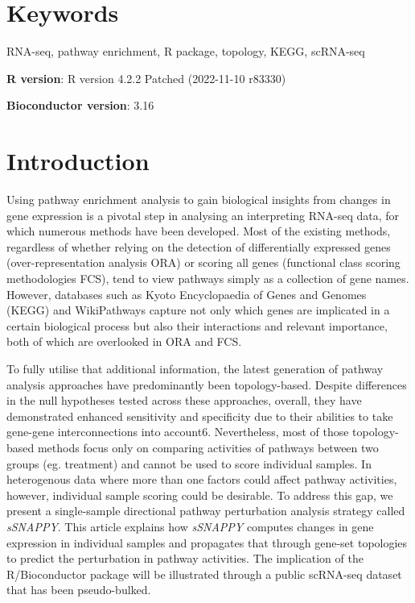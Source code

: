 \documentclass[9pt,a4paper,]{extarticle}
\begin{document}
\section*{Keywords}
RNA-seq, pathway enrichment, R package, topology, KEGG, scRNA-seq


\clearpage
\pagestyle{main}

\textbf{R version}: R version 4.2.2 Patched (2022-11-10 r83330)

\textbf{Bioconductor version}: 3.16

\hypertarget{introduction}{%
\section{Introduction}\label{introduction}}

Using pathway enrichment analysis to gain biological insights from changes in gene expression is a pivotal step in analysing an interpreting RNA-seq data, for which numerous methods have been developed. Most of the existing methods, regardless of whether relying on the detection of differentially expressed genes (over-representation analysis ORA)\citep{Al-Shahrour2005} or scoring all genes (functional class scoring methodologies FCS)\citep{Ackermann2009}, tend to view pathways simply as a collection of gene names. However, databases such as Kyoto Encyclopaedia of Genes and Genomes (KEGG)\citep{OgataKEGGKyotoEncyclopediaa} and WikiPathways\citep{Martens2021} capture not only which genes are implicated in a certain biological process but also their interactions and relevant importance, both of which are overlooked in ORA and FCS.

To fully utilise that additional information, the latest generation of pathway analysis approaches have predominantly been topology-based\citep{Khatri2012}. Despite differences in the null hypotheses tested across these approaches, overall, they have demonstrated enhanced sensitivity and specificity due to their abilities to take gene-gene interconnections into account6. Nevertheless, most of those topology-based methods focus only on comparing activities of pathways between two groups (eg. treatment) and cannot be used to score individual samples\citep{Ma2019, Bayerlova2015}. In heterogenous data where more than one factors could affect pathway activities, however, individual sample scoring could be desirable\citep{Hanzelmann2013}. To address this gap, we present a single-sample directional pathway perturbation analysis strategy called \emph{sSNAPPY}. This article explains how \emph{sSNAPPY} computes changes in gene expression in individual samples and propagates that through gene-set topologies to predict the perturbation in pathway activities. The implication of the R/Bioconductor package will be illustrated through a public scRNA-seq dataset that has been pseudo-bulked.
\end{document}
